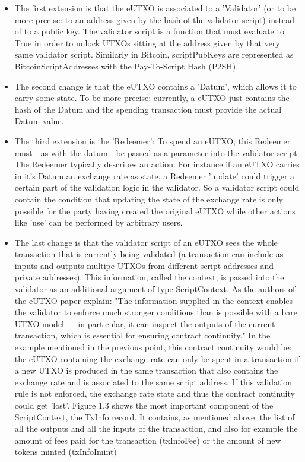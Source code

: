 \documentclass[a4paper,twoside,12pt]{report}
\begin{document}
\begin{itemize}

\item The first extension is that the eUTXO is associated to a 'Validator' (or to be more precise: to an address given by the hash of the validator script) instead of to a public key. The validator script is a function that must evaluate to True in order to unlock UTXOs sitting at the address given by that very same validator script. Similarly in Bitcoin, scriptPubKeys are represented as BitcoinScriptAddresses with the Pay-To-Script Hash (P2SH).

\item The second change is that the eUTXO contains a 'Datum', which allows it to carry some state. To be more precise: currently, a eUTXO just contains the hash of the Datum and the spending transaction must provide the actual Datum value.   

\item The third extension is the 'Redeemer': To spend an eUTXO, this Redeemer must - as with the datum - be passed as a parameter into the validator script. The Redeemer typically describes an action. For instance if an eUTXO carries in it's Datum an exchange rate as state, a Redeemer 'update' could trigger a certain part of the validation logic in the validator. So a validator script could contain the condition that updating the state of the exchange rate is only possible for the party having created the original eUTXO while other actions like 'use' can be performed by arbitrary users.

\item The last change is that the validator script of an eUTXO sees the whole transaction that is currently being validated (a transaction can include as inputs and outputs multipe UTXOs from different script addresses and private addresses). This information, called the context, is passed into the validator as an additional argument of type ScriptContext. As the authors of the eUTXO paper explain: "The information supplied in the context enables the validator to enforce much stronger conditions than is possible with a bare UTXO model — in particular, it can inspect the outputs of the current transaction, which is essential for ensuring contract continuity." In the example mentioned in the previous point, this contract continuity would be: the eUTXO containing the exchange rate can only be spent in a transaction if a new UTXO is produced in the same transaction that also contains the exchange rate and is associated to the same script address. If this validation rule is not enforced, the exchange rate state and thus the contract continuity could get 'lost'. 
Figure 1.3 shows the most important component of the ScriptContext, the TxInfo record. It contains, as mentioned above, the list of all the outputs and all the inputs of the transaction, and also for example the amount of fees paid for the transaction (txInfoFee) or the amount of new tokens minted (txInfoImint)  

\end{itemize}
\end{document}
